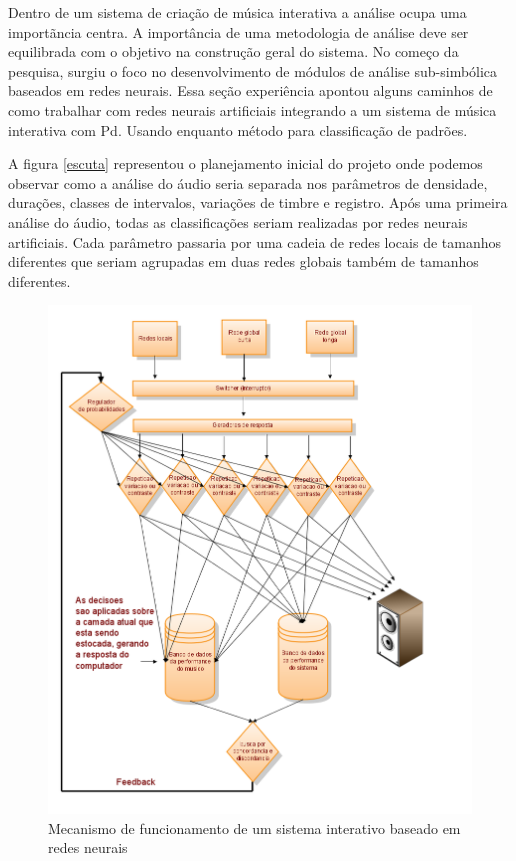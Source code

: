\documentclass[draft]{ppgmus}
\begin{document}

Dentro de um sistema de criação de música interativa  a análise ocupa uma importãncia centra. 
A importância de uma metodologia de análise deve ser equilibrada com o objetivo na construção geral do sistema.
No começo da pesquisa, surgiu o foco no desenvolvimento de módulos de análise sub-simbólica baseados em redes neurais.
Essa seção experiência apontou alguns caminhos de como trabalhar com redes neurais artificiais 
integrando a um sistema de música interativa com Pd. Usando enquanto método para classificação de
padrões.

A figura \ref{escuta} representou o planejamento inicial do projeto onde podemos observar como a 
análise do áudio seria separada nos parâmetros de
densidade, durações, classes de intervalos, variações de timbre e registro. Após uma primeira análise do
áudio, todas as classificações seriam realizadas por redes neurais artificiais. Cada parâmetro passaria
 por uma cadeia de redes locais de tamanhos diferentes que seriam agrupadas em duas 
redes globais também de tamanhos diferentes.

\begin{figure}
\includegraphics[scale=.5]{mecanismo}
\caption{Mecanismo de funcionamento de um sistema interativo baseado em redes neurais}
\label{mecanismo}
\end{figure}
\end{document}
